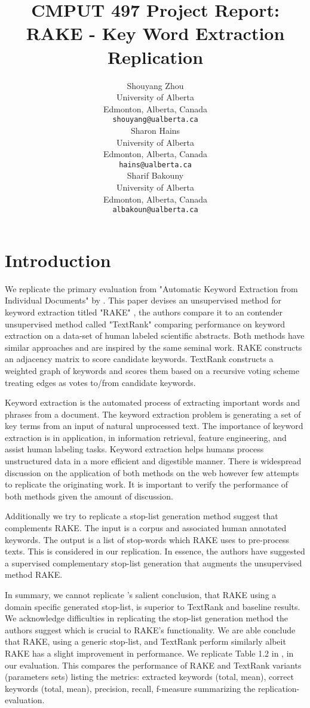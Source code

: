 \documentclass[11pt,a4paper]{article}
\title{CMPUT 497 Project Report: \\ RAKE - Key Word Extraction Replication}
\author{Shouyang Zhou \\
  University of Alberta \\
  Edmonton, Alberta, Canada \\
  {\tt shouyang@ualberta.ca} \\\And
  Sharon Hains \\
  University of Alberta \\
  Edmonton, Alberta, Canada \\
  {\tt hains@ualberta.ca} \\\And
  Sharif Bakouny\\
  University of Alberta \\
  Edmonton, Alberta, Canada \\
  {\tt albakoun@ualberta.ca} \\}
\date{}
\begin{document}
\maketitle

\section{Introduction}

We replicate the primary evaluation from "Automatic Keyword Extraction from Individual Documents" by \citet{1}. This paper devises an unsupervised method for keyword extraction titled "RAKE" , the authors compare it to an contender unsupervised method called "TextRank" comparing performance on keyword extraction on a data-set of human labeled scientific abstracts. Both methods have similar approaches and are inspired by the same seminal work. RAKE constructs an adjacency matrix to score candidate keywords. TextRank constructs a weighted graph of keywords and scores them based on a recursive voting scheme treating edges as votes to/from candidate keywords.

Keyword extraction is the automated process of extracting important words and phrases from a document. The keyword extraction problem is generating a set of key terms from an input of natural unprocessed text. The importance of keyword extraction is in application, in information retrieval, feature engineering, and assist human labeling tasks. Keyword extraction helps humans process unstructured data in a more efficient and digestible manner. There is widespread discussion on the application of both methods on the web however few attempts to replicate the originating work. It is important to verify the performance of both methods given the amount of discussion.  

Additionally we try to replicate a stop-list generation method \citet{1} suggest that complements RAKE. The input is a corpus and associated human annotated keywords. The output is a list of stop-words which RAKE uses to pre-process texts. This is considered in our replication. In essence, the authors have suggested a supervised complementary stop-list generation that augments the unsupervised method RAKE. 

In summary, we cannot replicate \citet{1}'s salient conclusion, that RAKE using a domain specific generated stop-list, is superior to TextRank and baseline results. We acknowledge difficulties in replicating the stop-list generation method the authors suggest which is crucial to RAKE's functionality. We are able conclude that RAKE, using a generic stop-list, and TextRank perform similarly albeit RAKE has a slight improvement in performance. We replicate Table 1.2 in \citet{1}, in our evaluation. This compares the performance of RAKE and TextRank variants (parameters sets) listing the metrics: extracted keywords (total, mean), correct keywords (total, mean), precision, recall, f-measure summarizing the replication-evaluation. 
\end{document}
